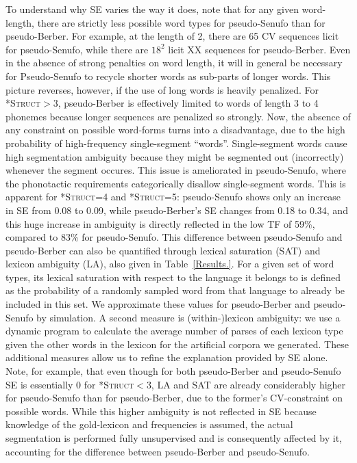 \documentclass[11pt]{article}
\begin{document}
To understand why SE varies the way it does, note that for any given word-length, there are strictly less possible word types for pseudo-Senufo than for pseudo-Berber. For example, at the length of 2, there are 65 CV sequences licit for pseudo-Senufo, while there are $18^2$ licit XX sequences for pseudo-Berber. Even in the absence of strong penalties on word length, it will in general be necessary for Pseudo-Senufo to recycle shorter words as sub-parts of longer words.  This picture reverses, however, if the use of long words is heavily penalized. For \textsc{*Struct}$>$3, pseudo-Berber is effectively limited to words of length 3 to 4 phonemes because longer sequences are penalized so strongly. Now, the absence of any constraint on possible word-forms turns into a disadvantage, due to the high probability of high-frequency single-segment ``words''. Single-segment words cause high segmentation ambiguity because they might be segmented out (incorrectly) whenever the segment occures. This issue is ameliorated in pseudo-Senufo, where the phonotactic requirements categorically disallow single-segment words. This is apparent for \textsc{*Struct}=4 and \textsc{*Struct}=5: pseudo-Senufo shows only an increase in SE from 0.08 to 0.09, while pseudo-Berber's SE changes from 0.18 to 0.34, and this huge increase in ambiguity is directly reflected in the low TF of 59\%, compared to 83\% for pseudo-Senufo. This difference between pseudo-Senufo and pseudo-Berber can also be quantified through lexical saturation (SAT) and lexicon ambiguity (LA), also given in Table~\ref{Results.}. For a given set of word types, its lexical saturation with respect to the language it belongs to is defined as the probability of a randomly sampled word from that language to already be included in this set. We approximate these values for pseudo-Berber and pseudo-Senufo by simulation. A second measure is (within-)lexicon ambiguity: we use a dynamic program to calculate the average number of parses of each lexicon type given the other words in the lexicon for the artificial corpora we generated. These additional measures allow us to refine the explanation provided by SE alone. Note, for example, that even though for both pseudo-Berber and pseudo-Senufo SE is essentially 0 for \textsc{*Struct}$<$3, LA and SAT are already considerably higher for pseudo-Senufo than for pseudo-Berber, due to the former's CV-constraint on possible words. While this higher ambiguity is not reflected in SE because knowledge of the gold-lexicon and frequencies is assumed, the actual segmentation is performed fully unsupervised and is consequently affected by it, accounting for the difference between pseudo-Berber and pseudo-Senufo.
\end{document}
